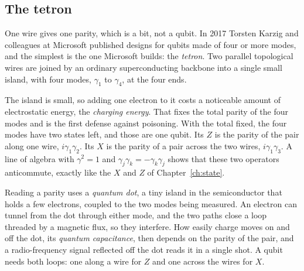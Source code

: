 \subsection*{The tetron}

One wire gives one parity, which is a bit, not a qubit. In 2017 Torsten Karzig and colleagues at
Microsoft published designs for qubits made of four or more modes, and the simplest is the one
Microsoft builds: the \emph{tetron}. Two parallel topological wires are joined by an ordinary
superconducting backbone into a single small island, with four modes, $\gamma_1$ to $\gamma_4$,
at the four ends.

The island is small, so adding one electron to it costs a noticeable amount of electrostatic
energy, the \emph{charging energy}. That fixes the total parity of the four modes and is the first
defense against poisoning. With the total fixed, the four modes have two states left, and those
are one qubit. Its $Z$ is the parity of the pair along one wire, $i\gamma_1\gamma_2$. Its $X$ is
the parity of a pair across the two wires, $i\gamma_1\gamma_3$. A line of algebra with
$\gamma^2 = 1$ and $\gamma_j\gamma_k = -\gamma_k\gamma_j$ shows that these two operators
anticommute, exactly like the $X$ and $Z$ of Chapter~\ref{ch:state}.

Reading a parity uses a \emph{quantum dot}, a tiny island in the semiconductor that holds a few
electrons, coupled to the two modes being measured. An electron can tunnel from the dot through
either mode, and the two paths close a loop threaded by a magnetic flux, so they interfere. How
easily charge moves on and off the dot, its \emph{quantum capacitance}, then depends on the
parity of the pair, and a radio-frequency signal reflected off the dot reads it in a single shot.
A qubit needs both loops: one along a wire for $Z$ and one across the wires for $X$.

